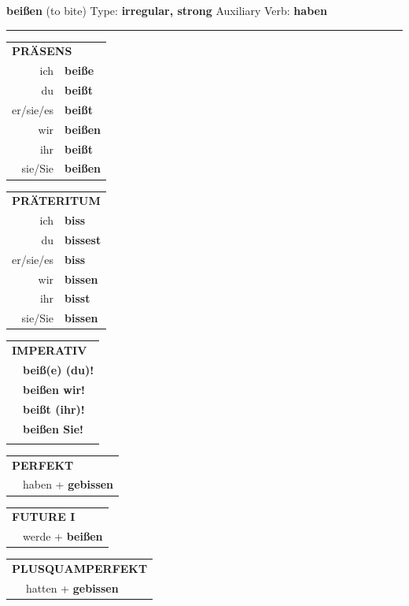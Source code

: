 \documentclass[10pt,a4paper]{revtex4-2}
\begin{document}
\begin{verbbox}
    {\Large \bf beißen} (to bite) \hfill Type: \textbf{irregular, strong} \hfill Auxiliary Verb: \textbf{haben} 
    
     \vspace{5pt}

    \hrule
    
    \vspace{5pt}

  \begin{tabular}{rl}
     \multicolumn{2}{l}{\textbf{PRÄSENS} }\\
    ich & \textbf{beiße}\\
    du & \textbf{beißt}\\
    er/sie/es & \textbf{beißt}\\
    wir & \textbf{beißen}\\
    ihr & \textbf{beißt}\\
    sie/Sie & \textbf{beißen}\\
  \end{tabular}
  \hfill
     \begin{tabular}{rl}
    \multicolumn{2}{l}{\textbf{PRÄTERITUM} }\\
    ich & \textbf{biss}\\
    du & \textbf{bissest}\\
    er/sie/es & \textbf{biss}\\
    wir & \textbf{bissen}\\
    ihr & \textbf{bisst}\\
    sie/Sie & \textbf{bissen}\\
  \end{tabular}
  \hfill
  \begin{tabular}{rl}
     \multicolumn{2}{l}{\textbf{IMPERATIV} }\\
   & \textbf{beiß(e) (du)!}\\
   & \textbf{beißen wir!}\\
   & \textbf{beißt (ihr)!}\\
   & \textbf{beißen Sie!}\\
   & \vspace{10pt}
  \end{tabular}

    \vspace{10pt}

 \begin{tabular}{rl}
     \multicolumn{2}{l}{\textbf{PERFEKT}}\\
   & haben + \textbf{gebissen}\\
  \end{tabular}
\hfill
   \begin{tabular}{rl}
    \multicolumn{2}{l}{\textbf{FUTURE I} }\\
   & werde + \textbf{beißen}\\
  \end{tabular}
\hfill
   \begin{tabular}{rl}
      \multicolumn{2}{l}{\textbf{PLUSQUAMPERFEKT}}\\
   & hatten + \textbf{gebissen}\\
  \end{tabular}


\end{verbbox}
\end{document}
